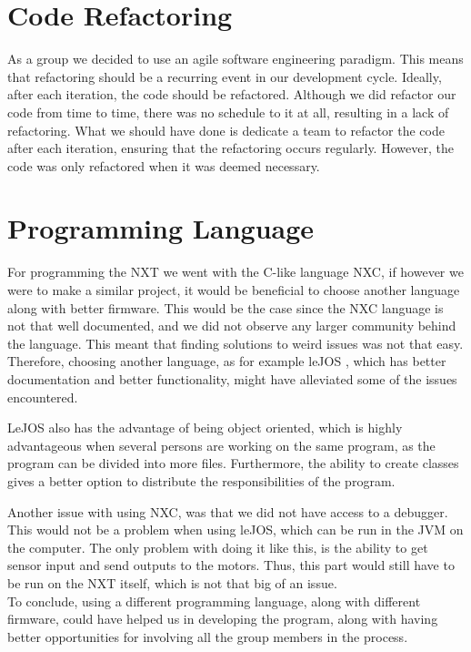 \section{Code Refactoring}
As a group we decided to use an agile software engineering paradigm. This means
that refactoring should be a recurring event in our development cycle.
Ideally, after each iteration, the code should be refactored. Although we did
refactor our code from time to time, there was no schedule to it at all,
resulting in a lack of refactoring. What we should have done is dedicate a team
to refactor the code after each iteration, ensuring that the refactoring occurs
regularly. However, the code was only refactored when it was deemed necessary.

\section{Programming Language}
For programming the NXT we went with the C-like language NXC, if however we were
to make a similar project, it would be beneficial to choose another language
along with better firmware. This would be the case since the NXC language is not
that well documented, and we did not observe any larger community behind
the language. This meant that finding solutions to weird issues was not that
easy. Therefore, choosing another language, as for example leJOS \cite{LeJos},
which has better documentation and better functionality, might have
alleviated some of the issues encountered.\nl

LeJOS also has the advantage of being object oriented, which is highly
advantageous when several persons are working on the same program, as the
program can be divided into more files. Furthermore, the ability to create
classes gives a better option to distribute the responsibilities of the
program.\nl

Another issue with using NXC, was that we did not have access to a debugger.
This would not be a problem when using leJOS, which can be run in the JVM on the
computer. The only problem with doing it like this, is the ability to get sensor
input and send outputs to the motors. Thus, this part would still have to be
run on the NXT itself, which is not that big of an issue.\\
To conclude, using a different programming language, along with different
firmware, could have helped us in developing the program, along with having
better opportunities for involving all the group members in the process.


